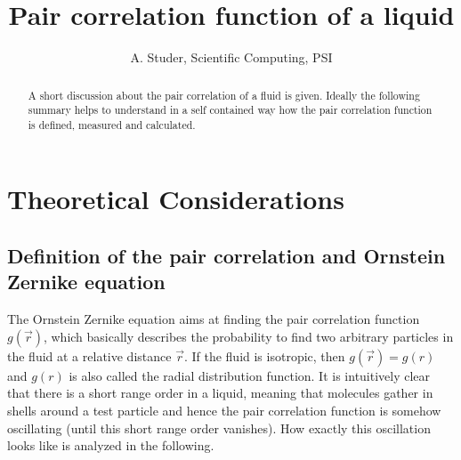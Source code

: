 \documentclass[11pt,a4paper]{article}
\author{A. Studer, Scientific Computing, PSI}
\title{Pair correlation function of a liquid}
\begin{document}
\maketitle

\begin{abstract}
A short discussion about the pair correlation of a fluid is given. Ideally the following summary
helps to understand in a self contained way how the pair correlation function is defined, measured and calculated.
\end{abstract}



\section{Theoretical Considerations}
\subsection{Definition of the pair correlation and Ornstein Zernike equation}
The Ornstein Zernike equation aims at finding the pair correlation function $g(\vec r)$, which basically
describes the probability to find two arbitrary particles in the fluid at a relative distance $\vec r$. 
If the fluid is isotropic, then $g(\vec r) = g(r)$ and $g(r)$ is also called the radial distribution function. 
It is intuitively clear that there is a short range order in a liquid, meaning that molecules gather in shells around a test particle
and hence the pair correlation function is somehow oscillating (until this short range order vanishes). How exactly this
oscillation looks like is analyzed in the following.
\end{document}
